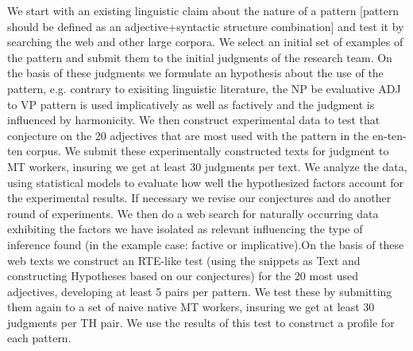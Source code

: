\documentclass[10pt]{article}
\begin{document}
\vspace {-3mm}

We start with an existing linguistic claim about the nature of a pattern [pattern should be defined as an adjective+syntactic structure combination] and test it by searching the web and other large corpora. We select an initial set of examples of the pattern and submit them to the initial judgments of the research team. On the basis of these judgments we formulate an hypothesis about the use of the pattern, e.g. contrary to exisiting linguistic literature, the NP be evaluative ADJ to VP pattern is used implicatively as well as factively and the judgment is influenced by harmonicity. We then construct experimental data to test that conjecture on the 20 adjectives that are most used with the pattern in the en-ten-ten corpus. We submit these experimentally constructed texts for judgment to MT workers, insuring we get at least 30 judgments per text. We analyze the data, using statistical models to evaluate how well the hypothesized factors account for the experimental results. If necessary we revise our conjectures and do another round of experiments. We then do a web search for naturally occurring data exhibiting the factors we have isolated as relevant influencing the type of inference found (in the example case: factive or implicative).On the basis of these web texts we construct an RTE-like test (using the snippets as Text and constructing Hypotheses based on our conjectures) for the 20 most used adjectives, developing at least 5 pairs per pattern. We test these by submitting them again to a set of naive native MT workers, insuring we get at least 30 judgments per TH pair. We use the results of this test to construct a profile for each pattern.  
\end{document}
